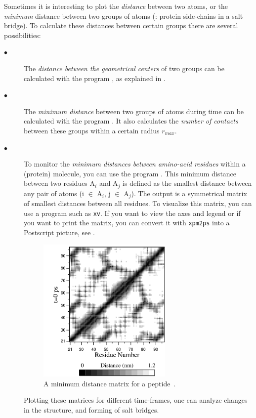 Sometimes it is interesting to plot the {\em distance} between two atoms,
or the {\em minimum} distance between two groups of atoms
({\eg}: protein side-chains in a salt bridge). 
To calculate these distances between certain groups there are several 
possibilities:
\begin{description}
\item[$\bullet$] 
The {\em distance between the geometrical centers} of two groups can be 
calculated with the program {\tt {}}, as explained in . 
\item[$\bullet$] 
The {\em minimum distance} between two groups of atoms during time 
can be calculated with the program {\tt {}}. It also calculates the 
{\em number of contacts} between these groups 
within a certain radius $r_{max}$.
\item[$\bullet$] 
To monitor the {\em minimum distances between amino-acid residues} 
within a (protein) molecule, you can use 
the program {\tt {}}. This minimum distance between two residues
A$_i$ and A$_j$ is defined as the smallest distance between any pair of 
atoms (i $\in$ A$_i$, j $\in$ A$_j$).
The output is a symmetrical matrix of smallest distances 
between all residues.
To visualize this matrix, you can use a program such as {\tt xv}.
If you want to view the axes and legend or if you want to print
the matrix, you can convert it with 
{\tt xpm2ps} into a Postscript picture, see .
\begin{figure}
\centerline{
\includegraphics[width=6.5cm]{plots/distm}}
\caption{A minimum distance matrix for a peptide~\protect\cite{Spoel96b}.}
\label{fig:mdmat}
\end{figure}

Plotting these matrices for different time-frames, one can analyze changes 
in the structure, and {\eg} forming of salt bridges.
\end{description}

